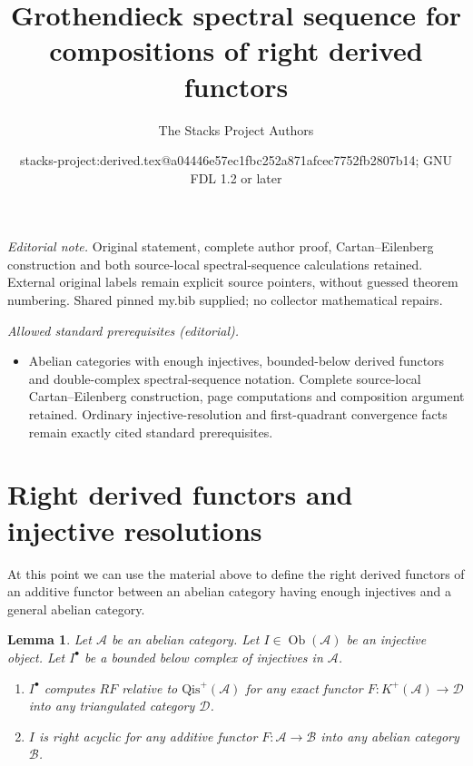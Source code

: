 \documentclass[10pt,a4paper]{article}
\title{Grothendieck spectral sequence for compositions of right derived functors}
\author{The Stacks Project Authors}
\date{stacks-project:derived.tex@a04446e57ec1fbc252a871afcec7752fb2807b14; GNU FDL 1.2 or later}
\theoremstyle{plain}
\newtheorem{lemma}[subsection]{Lemma}
\theoremstyle{definition}
\theoremstyle{remark}
\numberwithin{equation}{subsection}
\def\Ob{\mathop{\mathrm{Ob}}\nolimits}
\begin{document}
\maketitle
\noindent\textit{Editorial note.} Original statement, complete author proof, Cartan–Eilenberg construction and both source-local spectral-sequence calculations retained. External original labels remain explicit source pointers, without guessed theorem numbering. Shared pinned my.bib supplied; no collector mathematical repairs.\par\medskip
\noindent\textit{Allowed standard prerequisites (editorial).}\begin{itemize}
\item Abelian categories with enough injectives, bounded-below derived functors and double-complex spectral-sequence notation. Complete source-local Cartan–Eilenberg construction, page computations and composition argument retained. Ordinary injective-resolution and first-quadrant convergence facts remain exactly cited standard prerequisites.
\end{itemize}\medskip
\section{Right derived functors and injective resolutions}
\label{section-right-derived-functor}

\noindent
At this point we can use the material above to define the right derived
functors of an additive functor between an abelian category having
enough injectives and a general abelian category.

\begin{lemma}
\label{lemma-injective-acyclic}
Let $\mathcal{A}$ be an abelian category.
Let $I \in \Ob(\mathcal{A})$ be an injective object.
Let $I^\bullet$ be a bounded below complex of injectives in $\mathcal{A}$.
\begin{enumerate}
\item $I^\bullet$ computes $RF$ relative to $\text{Qis}^{+}(\mathcal{A})$
for any exact functor $F : K^{+}(\mathcal{A}) \to \mathcal{D}$
into any triangulated category $\mathcal{D}$.
\item $I$ is right acyclic for any additive functor
$F : \mathcal{A} \to \mathcal{B}$ into any abelian category $\mathcal{B}$.
\end{enumerate}
\end{lemma}
\end{document}
